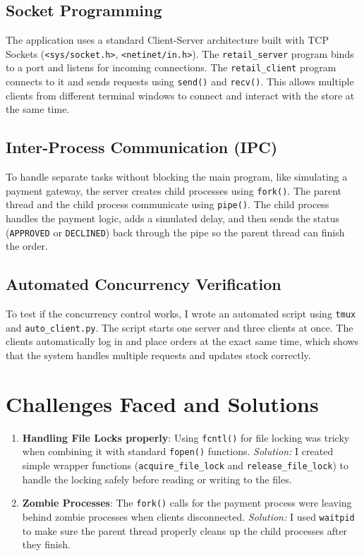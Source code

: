 \documentclass[12pt,a4paper]{article}
\begin{document}
\subsection{Socket Programming}
The application uses a standard Client-Server architecture built with TCP Sockets (\texttt{<sys/socket.h>}, \texttt{<netinet/in.h>}).
The \texttt{retail\_server} program binds to a port and listens for incoming connections. The \texttt{retail\_client} program connects to it and sends requests using \texttt{send()} and \texttt{recv()}. This allows multiple clients from different terminal windows to connect and interact with the store at the same time. 

\subsection{Inter-Process Communication (IPC)}
To handle separate tasks without blocking the main program, like simulating a payment gateway, the server creates child processes using \texttt{fork()}. 
The parent thread and the child process communicate using \texttt{pipe()}. The child process handles the payment logic, adds a simulated delay, and then sends the status (\texttt{APPROVED} or \texttt{DECLINED}) back through the pipe so the parent thread can finish the order.

\subsection{Automated Concurrency Verification}
To test if the concurrency control works, I wrote an automated script using \texttt{tmux} and \texttt{auto\_client.py}. The script starts one server and three clients at once. The clients automatically log in and place orders at the exact same time, which shows that the system handles multiple requests and updates stock correctly.

\newpage
\section{Challenges Faced and Solutions}
\begin{enumerate}
    \setlength{\itemsep}{0.5em}
    \item \textbf{Handling File Locks properly}: Using \texttt{fcntl()} for file locking was tricky when combining it with standard \texttt{fopen()} functions. \textit{Solution:} I created simple wrapper functions (\texttt{acquire\_file\_lock} and \texttt{release\_file\_lock}) to handle the locking safely before reading or writing to the files.
    \item \textbf{Zombie Processes}: The \texttt{fork()} calls for the payment process were leaving behind zombie processes when clients disconnected. \textit{Solution:} I used \texttt{waitpid} to make sure the parent thread properly cleans up the child processes after they finish.
\end{enumerate}
\end{document}
